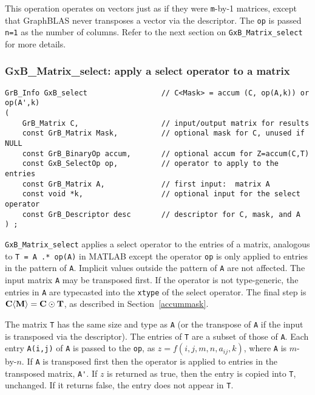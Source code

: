 \documentclass[12pt]{article}
\begin{document}
This operation operates on vectors just as if they were \verb'm'-by-1 matrices,
except that GraphBLAS never transposes a vector via the descriptor.  The
\verb'op' is passed \verb'n=1' as the number of columns.  Refer to the next
section on \verb'GxB_Matrix_select' for more details.

\newpage
\subsubsection{{\sf GxB\_Matrix\_select:} apply a select operator to a matrix}
\label{select_matrix}

\begin{mdframed}[userdefinedwidth=6in]
{\footnotesize
\begin{verbatim}
GrB_Info GxB_select                 // C<Mask> = accum (C, op(A,k)) or op(A',k)
(
    GrB_Matrix C,                   // input/output matrix for results
    const GrB_Matrix Mask,          // optional mask for C, unused if NULL
    const GrB_BinaryOp accum,       // optional accum for Z=accum(C,T)
    const GxB_SelectOp op,          // operator to apply to the entries
    const GrB_Matrix A,             // first input:  matrix A
    const void *k,                  // optional input for the select operator
    const GrB_Descriptor desc       // descriptor for C, mask, and A
) ;
\end{verbatim} } \end{mdframed}

\verb'GxB_Matrix_select' applies a select operator to the entries of a matrix,
analogous to \verb'T = A .* op(A)'  in MATLAB except the operator \verb'op' is
only applied to entries in the pattern of \verb'A'.  Implicit values outside
the pattern of \verb'A' are not affected.  The input matrix \verb'A' may be
transposed first.  If the operator is not type-generic, the entries in \verb'A'
are typecasted into the \verb'xtype' of the select operator.  The final step is
${\bf C \langle M \rangle  = C \odot T}$, as described in
Section~\ref{accummask}.

The matrix \verb'T' has the same size and type as \verb'A' (or the transpose of
\verb'A' if the input is transposed via the descriptor).  The entries of
\verb'T' are a subset of those of \verb'A'.  Each entry \verb'A(i,j)' of
\verb'A' is passed to the \verb'op', as $z=f(i,j,m,n,a_{ij},k)$, where \verb'A'
is $m$-by-$n$.  If \verb'A' is transposed first then the operator is applied to
entries in the transposed matrix, \verb"A'".  If $z$ is returned as true, then
the entry is copied into \verb'T', unchanged.  If it returns false, the entry
does not appear in \verb'T'.
\end{document}
